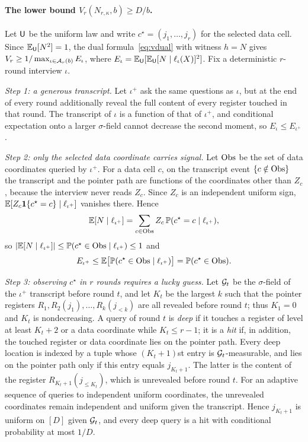 \paragraph{The lower bound $V_r(N_{r,\kappa},b)\ge D/b$.}
Let $\mathsf U$ be the uniform law and write $c^\star=(j_1,\ldots,j_r)$ for the
selected data cell. Since $\mathbb{E}_\mathsf U[N^2]=1$, the dual formula~\eqref{eq:vdual}
with witness $h=N$ gives $V_r\ge1/\max_{\iota\in\mathcal A_r(b)}E_\iota$, where
$E_\iota=\mathbb{E}_\mathsf U[\mathbb{E}_\mathsf U[N\mid\ell_\iota(X)]^2]$. Fix a deterministic $r$-round
interview $\iota$.

\emph{Step 1: a generous transcript.}
Let $\iota^+$ ask the same questions as $\iota$, but at the end of every
round additionally reveal the full content of every register touched in that
round. The transcript of $\iota$ is a function of that of $\iota^+$, and
conditional expectation onto a larger $\sigma$-field cannot decrease the
second moment, so $E_\iota\le E_{\iota^+}$.

\emph{Step 2: only the selected data coordinate carries signal.}
Let ${\rm Obs}$ be the set of data coordinates queried by $\iota^+$. For a
data cell $c$, on the transcript event $\{c\notin{\rm Obs}\}$ the transcript
and the pointer path are functions of the coordinates other than $Z_c$,
because the interview never reads $Z_c$. Since $Z_c$ is an independent
uniform sign, $\mathbb{E}[Z_c\mathbf 1\{c^\star=c\}\mid\ell_{\iota^+}]$ vanishes there.
Hence
\[
 \mathbb{E}[N\mid\ell_{\iota^+}]=\sum_{c\in{\rm Obs}}Z_c\,\mathbb P(c^\star=c\mid\ell_{\iota^+}),
\]
so $|\mathbb{E}[N\mid\ell_{\iota^+}]|\le\mathbb P(c^\star\in{\rm Obs}\mid\ell_{\iota^+})\le1$ and
\[
 E_{\iota^+}\le\mathbb{E}\big[\mathbb P(c^\star\in{\rm Obs}\mid\ell_{\iota^+})\big]
 =\mathbb P(c^\star\in{\rm Obs}).
\]

\emph{Step 3: observing $c^\star$ in $r$ rounds requires a lucky guess.}
Let $\mathcal G_t$ be the $\sigma$-field of the $\iota^+$ transcript before round $t$,
and let $K_t$ be the largest $k$ such that the pointer registers
$R_1,R_2(j_1),\ldots,R_k(j_{<k})$ are all revealed before round $t$; thus
$K_1=0$ and $K_t$ is nondecreasing. A query of round $t$ is \emph{deep} if it
touches a register of level at least $K_t+2$ or a data coordinate while
$K_t\le r-1$; it is a \emph{hit} if, in addition, the touched register or
data coordinate lies on the pointer path. Every deep location is indexed by a
tuple whose $(K_t+1)$st entry is $\mathcal G_t$-measurable, and lies on the pointer
path only if this entry equals $j_{K_t+1}$. The latter is the content of the
register $R_{K_t+1}(j_{\le K_t})$, which is unrevealed before round $t$.
For an adaptive sequence of queries to independent uniform coordinates, the
unrevealed coordinates remain independent and uniform given the
transcript. Hence $j_{K_t+1}$ is uniform on $[D]$ given $\mathcal G_t$, and every deep
query is a hit with conditional probability at most $1/D$.

